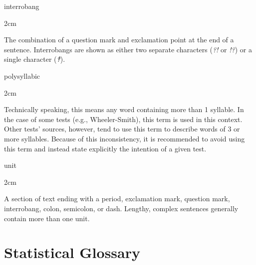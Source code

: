 \documentclass[
]{book}
\newenvironment{glsentry}
  {
  \begin{minipage}{\textwidth}
  }
  {
  \end{minipage}
  }
\newenvironment{glsterm}
  {
  \bfseries
  }
  {
  }
\newenvironment{glsdef}
  {
  \noindent
  \flushleft
  \begin{adjustwidth}{2cm}{}
  }
  {
  \end{adjustwidth}
  }
\theoremstyle{definition}
\theoremstyle{definition}
\theoremstyle{definition}
\theoremstyle{definition}
\theoremstyle{remark}
\begin{document}
\begin{glsentry}

\begin{glsterm}
interrobang

\end{glsterm}

\begin{glsdef}
The combination of a question mark and exclamation point at the end of a sentence. Interrobangs are shown as either two separate characters (\emph{?!} or \emph{!?}) or a single character (\emph{‽}).

\end{glsdef}

\end{glsentry}

\begin{glsentry}

\begin{glsterm}
polysyllabic

\end{glsterm}

\begin{glsdef}
Technically speaking, this means any word containing more than 1 syllable. In the case of some tests (e.g., Wheeler-Smith), this term is used in this context. Other tests' sources, however, tend to use this term to describe words of 3 or more syllables. Because of this inconsistency, it is recommended to avoid using this term and instead state explicitly the intention of a given test.

\end{glsdef}

\end{glsentry}

\begin{glsentry}

\begin{glsterm}
unit

\end{glsterm}

\begin{glsdef}
A section of text ending with a period, exclamation mark, question mark, interrobang, colon, semicolon, or dash. Lengthy, complex sentences generally contain more than one unit.

\end{glsdef}

\end{glsentry}

\hypertarget{stat-terms}{%
\section{Statistical Glossary}\label{stat-terms}}
\end{document}
